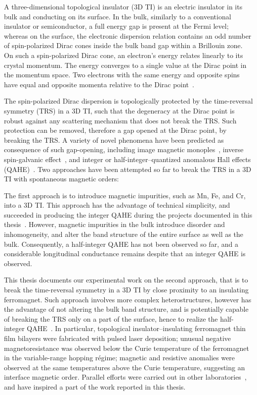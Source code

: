 A three-dimensional topological insulator (3D TI) is an electric insulator in its bulk and conducting on its surface. In the bulk, similarly to a conventional insulator or semiconductor, a full energy gap is present at the Fermi level; whereas on the surface, the electronic dispersion relation contains an odd number of spin-polarized Dirac cones inside the bulk band gap within a Brillouin zone. On such a spin-polarized Dirac cone, an electron's energy relates linearly to its crystal momentum. The energy converges to a single value at the Dirac point in the momentum space. Two electrons with the same energy and opposite spins have equal and opposite momenta relative to the Dirac point~\cite{TI_Qi, TI_Col}.

The spin-polarized Dirac dispersion is topologically protected by the time-reversal symmetry (TRS) in a 3D TI, such that the degeneracy at the Dirac point is robust against any scattering mechanism that does not break the TRS. Such protection can be removed, therefore a gap opened at the Dirac point, by breaking the TRS. A variety of novel phenomena have been predicted as consequence of such gap-opening, including image magnetic monoples~\cite{TI_birth, TI_monopole}, inverse spin-galvanic effect~\cite{ISG}, and integer or half-integer--quantized anomalous Hall effects (QAHE)~\cite{TI_Col, QAH_TI_Yu}. Two approaches have been attempted so far to break the TRS in a 3D TI with spontaneous magnetic orders:

The first approach is to introduce magnetic impurities, such as Mn, Fe, and Cr, into a 3D TI. This approach has the advantage of technical simplicity, and succeeded in producing the integer QAHE during the projects documented in this thesis~\cite{Chang2013, Kou2014}. However, magnetic impurities in the bulk introduce disorder and inhomogeneity, and alter the band structure of the entire surface as well as the bulk. Consequently, a half-integer QAHE has not been observed so far, and a considerable longitudinal conductance remains despite that an integer QAHE is observed.

This thesis documents our experimental work on the second approach, that is to break the time-reversal symmetry in a 3D TI by close proximity to an insulating ferromagnet. Such approach involves more complex heterostructures, however has the advantage of not altering the bulk band structure, and is potentially capable of breaking the TRS only on a part of the surface, hence to realize the half-integer QAHE~\cite{TI_Col}. In particular, topological insulator--insulating ferromagnet thin film bilayers were fabricated with pulsed laser deposition; unusual negative magnetoresistance was observed below the Curie temperature of the ferromagnet in the variable-range hopping r\'egime; magnetic and resistive anomalies were observed at the same temperatures above the Curie temperature, suggesting an interface magnetic order. Parallel efforts were carried out in other laboratories~\cite{Moodera2013, Samarth2013, Moodera2016}, and have inspired a part of the work reported in this thesis.

